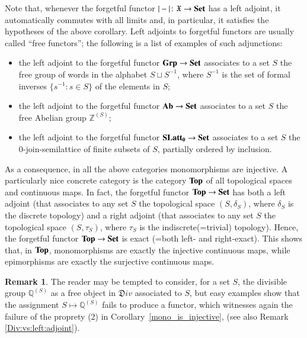 \documentclass[12pt]{article}
\theoremstyle{definition}
\newtheorem{remark}[lemma]{Remark}
\def\Z{\mathbb Z}
\def\Q{\mathbb Q}
\def\X{\mathfrak X}
\newcommand{\Set}{\textbf{\textup{Set}}}
\newcommand{\Ab}{\textbf{\textup{Ab}}}
\newcommand{\Grp}{\textbf{\textup{Grp}}}
\renewcommand{\Top}{\textbf{\textup{Top}}}
\newcommand{\SLatt}{\mathbf{SLatt_0}}
\numberwithin{equation}{section}
\begin{document}
Note that, whenever the forgetful functor $|-|\colon \X\to \Set$ has a left adjoint, it automatically commutes with all limits and, in particular, it satisfies the hypotheses of the above corollary. Left adjoints to forgetful functors are usually called ``free functors''; the following is a list of examples of such adjunctions:
\begin{itemize}
\item the left adjoint to the forgetful functor $\Grp\to \Set$ associates to a set $S$ the free group of words in the alphabet $S\sqcup S^{-1}$, where $S^{-1}$ is the set of formal inverses $\{s^{-1}:s\in S\}$ of the elements in $S$;
\item the left adjoint to the forgetful functor $\Ab\to \Set$ associates to a set $S$ the free Abelian group $\Z^{(S)}$;
\item  the left adjoint to the forgetful functor $\SLatt\to \Set$ associates to a set $S$ the $0$-join-semilattice of finite subsets of $S$, partially ordered by inclusion.
\end{itemize}
As a consequence, in all the above categories monomorphisms are injective. A particularly nice concrete category is the category $\Top$ of all topological spaces and continuous maps. In fact, the forgetful functor $\Top\to \Set$ has both a left adjoint (that associates to any set $S$ the topological space $(S,\delta_S)$, where $\delta_S$ is the discrete topology) and a right adjoint (that associates to any set $S$ the topological space $(S,\tau_S)$, where $\tau_S$ is the indiscrete(=trivial) topology). Hence, the forgetful functor $\Top\to \Set$ is exact (=both left- and right-exact). This shows that, in $\Top$, monomorphisms are exactly the injective continuous maps, while epimorphisms are exactly the surjective continuous maps.

\begin{remark}
The reader may be tempted to consider, for a set $S$, the divisible group $\Q^{(S)}$ as a free object in $\mathfrak D iv$ associated to $S$, but easy examples show that the assignment $S \mapsto \Q^{(S)}$ fails to produce a functor, which witnesses again the failure of the proprety (2) in Corollary~\ref{mono_is_injective}, (see also Remark \ref{Div:vs:left:adjoint}).
\end{remark}
\end{document}
